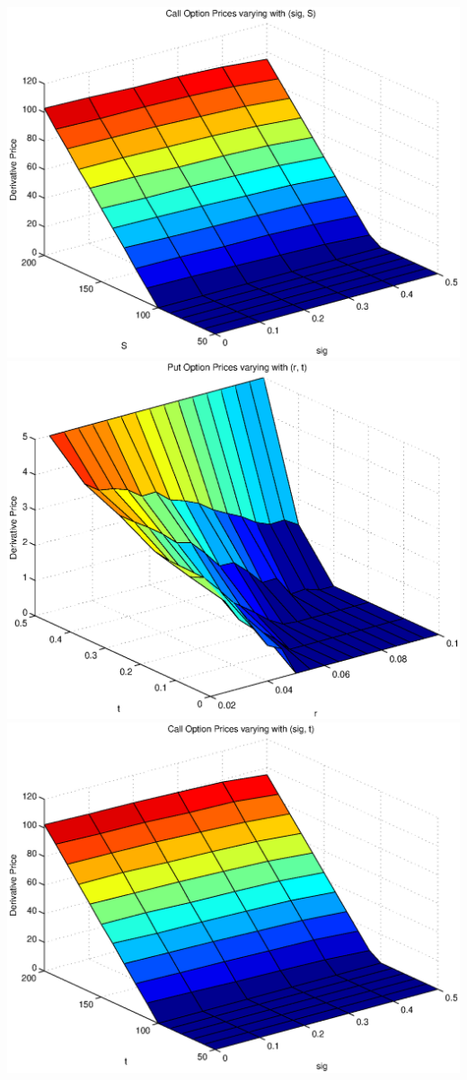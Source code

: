 \documentclass{article}
\begin{document}
\includegraphics[width=\textwidth]{Call_Option_Prices_varying_with_(sig,_S)}
\includegraphics[width=\textwidth]{Put_Option_Prices_varying_with_(r,_t)}
\includegraphics[width=\textwidth]{Call_Option_Prices_varying_with_(sig,_t)}
\end{document}
